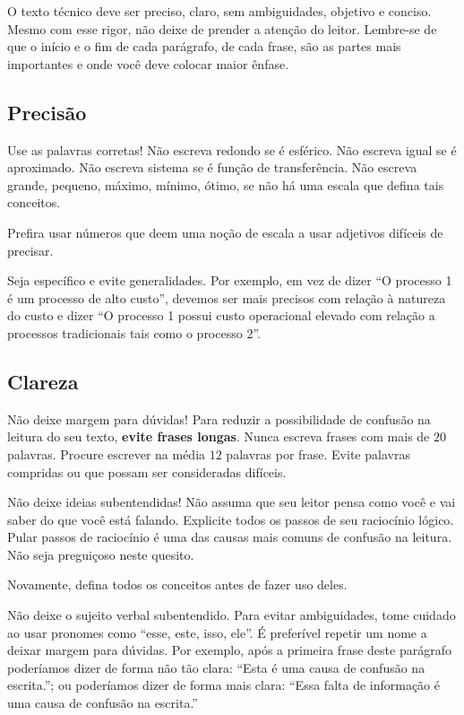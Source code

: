 O texto técnico deve ser preciso, claro, sem ambiguidades, objetivo e conciso. Mesmo com esse rigor, não deixe de prender a atenção do leitor. Lembre-se de que o início e o fim de cada parágrafo, de cada frase, são as partes mais importantes e onde você deve colocar maior ênfase.


\subsection{Precisão}

Use as palavras corretas! Não escreva redondo se é esférico. Não escreva igual se é aproximado. Não escreva sistema se é função de transferência. Não escreva grande, pequeno, máximo, mínimo, ótimo, se não há uma escala que defina tais conceitos.

Prefira usar números que deem uma noção de escala a usar adjetivos difíceis de precisar.

Seja específico e evite generalidades. Por exemplo, em vez de dizer ``O processo 1 é um processo de alto custo'', devemos ser mais precisos com relação à natureza do custo e dizer ``O processo 1 possui custo operacional elevado com relação a processos tradicionais tais como o processo 2''.

\subsection{Clareza}

Não deixe margem para dúvidas! Para reduzir a possibilidade de confusão na leitura do seu texto, \textbf{evite frases longas}. Nunca escreva frases com mais de $20$ palavras. Procure escrever na média $12$ palavras por frase. Evite palavras compridas ou que possam ser consideradas difíceis.

Não deixe ideias subentendidas! Não assuma que seu leitor pensa como você e vai saber do que você está falando. Explicite todos os passos de seu raciocínio lógico. Pular passos de raciocínio é uma das causas mais comuns de confusão na leitura. Não seja preguiçoso neste quesito.

Novamente, defina todos os conceitos antes de fazer uso deles.

Não deixe o sujeito verbal subentendido. Para evitar ambiguidades, tome cuidado ao usar pronomes como ``esse, este, isso, ele''. É preferível repetir um nome a deixar margem para dúvidas. Por exemplo, após a primeira frase deste parágrafo poderíamos dizer de forma não tão clara: ``Esta é uma causa de confusão na escrita.''; ou poderíamos dizer de forma mais clara: ``Essa falta de informação é uma causa de confusão na escrita.''

